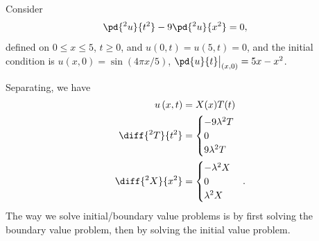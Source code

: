 \documentclass[10pt]{mypackage}
\begin{document}
\begin{example}
  Consider
  \begin{align*}
    \pd{^2u}{t^2} - 9 \pd{^2u}{x^2} &= 0,
  \end{align*}
  defined on $0\leq x \leq 5$, $t\geq 0$, and $u\left( 0,t \right) = u\left( 5,t \right) = 0$, and the initial condition is $u\left( x,0 \right) = \sin\left( 4\pi x/5 \right)$, $\pd{u}{t}\bigr\vert_{(x,0)} = 5x-x^2$.\newline

  Separating, we have
  \begin{align*}
    u\left( x,t \right) &= X(x)T(t)\\
    \diff{^2 T}{t^2} &= \begin{cases}
      -9\lambda^2 T\\
      0\\
      9\lambda^2T
    \end{cases}\\
      \diff{^2X}{x^2} &= \begin{cases}
        -\lambda^2 X\\
        0\\
        \lambda^2 X
      \end{cases}.
  \end{align*}
  The way we solve initial/boundary value problems is by first solving the boundary value problem, then by solving the initial value problem.\newline


\end{example}
\end{document}
